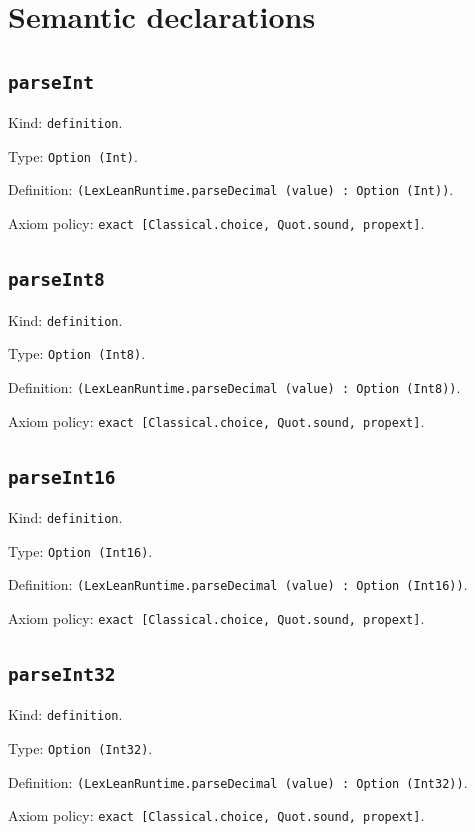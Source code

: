 \documentclass[11pt]{article}
\begin{document}
\section*{Semantic declarations}
\subsection*{\texttt{parseInt}}
\noindent Kind: \texttt{definition}.\par
\noindent Type: \texttt{Option (Int)}.\par
\noindent Definition: \texttt{(LexLeanRuntime.parseDecimal (value) : Option (Int))}.\par
\noindent Axiom policy: \texttt{exact [Classical.choice, Quot.sound, propext]}.\par
\subsection*{\texttt{parseInt8}}
\noindent Kind: \texttt{definition}.\par
\noindent Type: \texttt{Option (Int8)}.\par
\noindent Definition: \texttt{(LexLeanRuntime.parseDecimal (value) : Option (Int8))}.\par
\noindent Axiom policy: \texttt{exact [Classical.choice, Quot.sound, propext]}.\par
\subsection*{\texttt{parseInt16}}
\noindent Kind: \texttt{definition}.\par
\noindent Type: \texttt{Option (Int16)}.\par
\noindent Definition: \texttt{(LexLeanRuntime.parseDecimal (value) : Option (Int16))}.\par
\noindent Axiom policy: \texttt{exact [Classical.choice, Quot.sound, propext]}.\par
\subsection*{\texttt{parseInt32}}
\noindent Kind: \texttt{definition}.\par
\noindent Type: \texttt{Option (Int32)}.\par
\noindent Definition: \texttt{(LexLeanRuntime.parseDecimal (value) : Option (Int32))}.\par
\noindent Axiom policy: \texttt{exact [Classical.choice, Quot.sound, propext]}.\par
\end{document}
